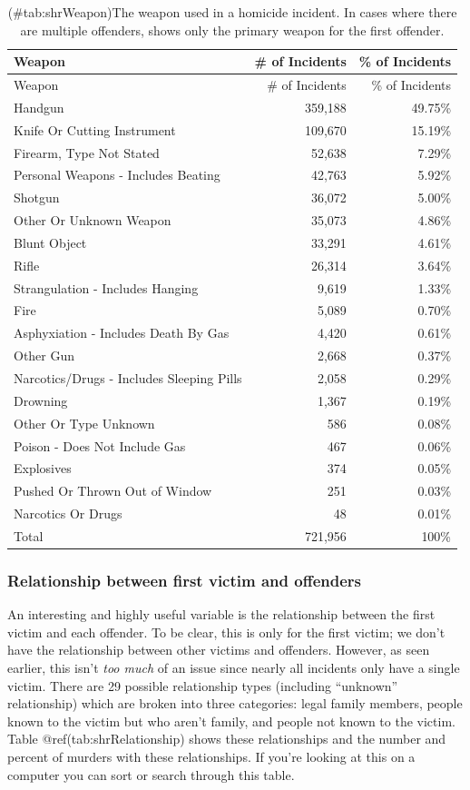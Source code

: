 \documentclass[
  12pt,
  openany]{book}
\begin{document}
\begin{longtable}[]{@{}lrr@{}}
\caption{(\#tab:shrWeapon)The weapon used in a homicide incident. In cases where there are multiple offenders, shows only the primary weapon for the first offender.}\tabularnewline
\toprule
Weapon & \# of Incidents & \% of Incidents\tabularnewline
\midrule
\endfirsthead
\toprule
Weapon & \# of Incidents & \% of Incidents\tabularnewline
\midrule
\endhead
Handgun & 359,188 & 49.75\%\tabularnewline
Knife Or Cutting Instrument & 109,670 & 15.19\%\tabularnewline
Firearm, Type Not Stated & 52,638 & 7.29\%\tabularnewline
Personal Weapons - Includes Beating & 42,763 & 5.92\%\tabularnewline
Shotgun & 36,072 & 5.00\%\tabularnewline
Other Or Unknown Weapon & 35,073 & 4.86\%\tabularnewline
Blunt Object & 33,291 & 4.61\%\tabularnewline
Rifle & 26,314 & 3.64\%\tabularnewline
Strangulation - Includes Hanging & 9,619 & 1.33\%\tabularnewline
Fire & 5,089 & 0.70\%\tabularnewline
Asphyxiation - Includes Death By Gas & 4,420 & 0.61\%\tabularnewline
Other Gun & 2,668 & 0.37\%\tabularnewline
Narcotics/Drugs - Includes Sleeping Pills & 2,058 & 0.29\%\tabularnewline
Drowning & 1,367 & 0.19\%\tabularnewline
Other Or Type Unknown & 586 & 0.08\%\tabularnewline
Poison - Does Not Include Gas & 467 & 0.06\%\tabularnewline
Explosives & 374 & 0.05\%\tabularnewline
Pushed Or Thrown Out of Window & 251 & 0.03\%\tabularnewline
Narcotics Or Drugs & 48 & 0.01\%\tabularnewline
Total & 721,956 & 100\%\tabularnewline
\bottomrule
\end{longtable}

\hypertarget{relationship-between-first-victim-and-offenders}{%
\subsubsection{Relationship between first victim and offenders}\label{relationship-between-first-victim-and-offenders}}

An interesting and highly useful variable is the relationship between the first victim and each offender. To be clear, this is only for the first victim; we don't have the relationship between other victims and offenders. However, as seen earlier, this isn't \emph{too much} of an issue since nearly all incidents only have a single victim. There are 29 possible relationship types (including ``unknown'' relationship) which are broken into three categories: legal family members, people known to the victim but who aren't family, and people not known to the victim. Table @ref(tab:shrRelationship) shows these relationships and the number and percent of murders with these relationships. If you're looking at this on a computer you can sort or search through this table.
\end{document}
